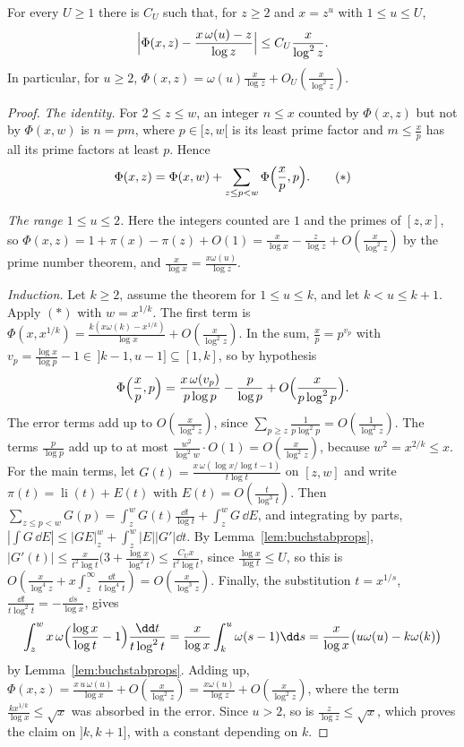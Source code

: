 \begin{theorem}\label{thm:buchstab}
For every $U\ge1$ there is $C_U$ such that, for $z\ge2$ and $x=z^u$ with $1\le u\le U$,
\[
\Bigl|\Phi(x,z)-\frac{x\,\omega(u)-z}{\log z}\Bigr|\le C_U\frac x{\log^2z}.
\]
In particular, for $u\ge2$, $\Phi(x,z)=\omega(u)\frac x{\log z}+O_U(\frac x{\log^2z})$.
\end{theorem}
\begin{proof}
\emph{The identity.} For $2\le z\le w$, an integer $n\le x$ counted by $\Phi(x,z)$ but not by $\Phi(x,w)$ is $n=pm$, where $p\in[z,w[$ is its least prime factor and $m\le\frac xp$ has all its prime factors at least $p$. Hence
\[
\Phi(x,z)=\Phi(x,w)+\sum_{z\le p<w}\Phi\Bigl(\frac xp,p\Bigr).\tag{$\ast$}
\]

\emph{The range $1\le u\le2$.} Here the integers counted are $1$ and the primes of $[z,x]$, so $\Phi(x,z)=1+\pi(x)-\pi(z)+O(1)=\frac x{\log x}-\frac z{\log z}+O(\frac x{\log^2z})$ by the prime number theorem, and $\frac x{\log x}=\frac{x\omega(u)}{\log z}$.

\emph{Induction.} Let $k\ge2$, assume the theorem for $1\le u\le k$, and let $k<u\le k+1$. Apply $(\ast)$ with $w=x^{1/k}$. The first term is $\Phi(x,x^{1/k})=\frac{k(x\omega(k)-x^{1/k})}{\log x}+O(\frac x{\log^2z})$. In the sum, $\frac xp=p^{v_p}$ with $v_p=\frac{\log x}{\log p}-1\in\,]k-1,u-1]\subseteq[1,k]$, so by hypothesis
\[
\Phi\Bigl(\frac xp,p\Bigr)=\frac{x\,\omega(v_p)}{p\log p}-\frac p{\log p}+O\Bigl(\frac x{p\log^2p}\Bigr).
\]
The error terms add up to $O(\frac x{\log^2z})$, since $\sum_{p\ge z}\frac1{p\log^2p}=O(\frac1{\log^2z})$. The terms $\frac p{\log p}$ add up to at most $\frac{w^2}{\log^2w}\cdot O(1)=O(\frac x{\log^2z})$, because $w^2=x^{2/k}\le x$. For the main terms, let $G(t)=\frac{x\,\omega(\log x/\log t-1)}{t\log t}$ on $[z,w]$ and write $\pi(t)=\operatorname{li}(t)+E(t)$ with $E(t)=O(\frac t{\log^3t})$. Then $\sum_{z\le p<w}G(p)=\int_z^wG(t)\frac{\dd t}{\log t}+\int_z^wG\,\dd E$, and integrating by parts, $|\int G\,\dd E|\le|GE|_z^w+\int_z^w|E||G'|\dd t$. By Lemma~\ref{lem:buchstabprops}, $|G'(t)|\le\frac{x}{t^2\log t}\bigl(3+\frac{\log x}{\log^2t}\bigr)\le\frac{C_Ux}{t^2\log t}$, since $\frac{\log x}{\log t}\le U$, so this is $O(\frac x{\log^4z}+x\int_z^\infty\frac{\dd t}{t\log^4t})=O(\frac x{\log^3z})$. Finally, the substitution $t=x^{1/s}$, $\frac{\dd t}{t\log^2t}=-\frac{\dd s}{\log x}$, gives
\[
\int_z^wx\,\omega\Bigl(\frac{\log x}{\log t}-1\Bigr)\frac{\dd t}{t\log^2t}=\frac x{\log x}\int_k^u\omega(s-1)\dd s=\frac x{\log x}\bigl(u\omega(u)-k\omega(k)\bigr)
\]
by Lemma~\ref{lem:buchstabprops}. Adding up, $\Phi(x,z)=\frac{x\,u\,\omega(u)}{\log x}+O(\frac x{\log^2z})=\frac{x\omega(u)}{\log z}+O(\frac x{\log^2z})$, where the term $\frac{kx^{1/k}}{\log x}\le\sqrt x$ was absorbed in the error. Since $u>2$, so is $\frac z{\log z}\le\sqrt x$, which proves the claim on $]k,k+1]$, with a constant depending on $k$.
\end{proof}

